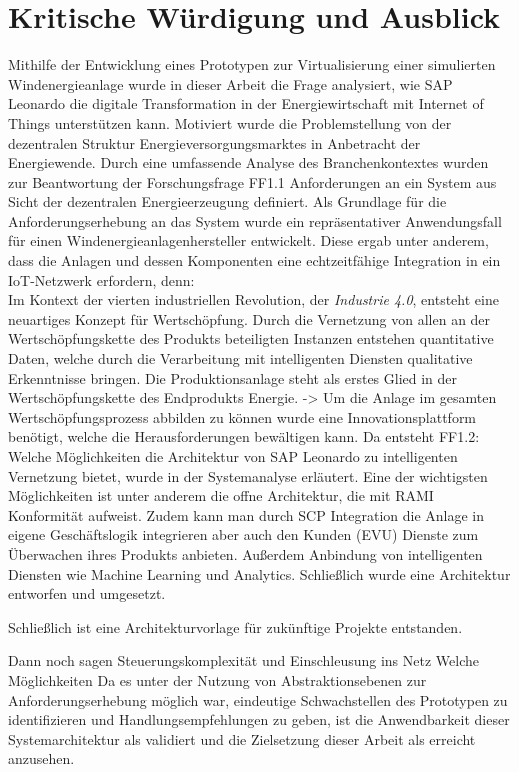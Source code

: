 \section{Kritische Würdigung und Ausblick}

Mithilfe der Entwicklung eines Prototypen zur Virtualisierung einer simulierten Windenergieanlage wurde in dieser Arbeit die Frage analysiert, wie SAP Leonardo die digitale Transformation in der Energiewirtschaft mit Internet of Things unterstützen kann. Motiviert wurde die Problemstellung von der dezentralen Struktur Energieversorgungsmarktes in Anbetracht der Energiewende. Durch eine umfassende Analyse des Branchenkontextes wurden zur Beantwortung der Forschungsfrage FF1.1 Anforderungen an ein System aus Sicht der dezentralen Energieerzeugung definiert. Als Grundlage für die Anforderungserhebung an das System wurde ein repräsentativer Anwendungsfall für einen Windenergieanlagenhersteller entwickelt. Diese ergab unter anderem, dass die Anlagen und dessen Komponenten eine echtzeitfähige Integration in ein IoT-Netzwerk erfordern, denn:
\\Im Kontext der vierten industriellen Revolution, der \textit{Industrie 4.0}, entsteht eine neuartiges Konzept für Wertschöpfung. Durch die Vernetzung von allen an der Wertschöpfungskette des Produkts beteiligten Instanzen entstehen quantitative Daten, welche durch die Verarbeitung mit intelligenten Diensten qualitative Erkenntnisse bringen. Die Produktionsanlage steht als erstes Glied in der Wertschöpfungskette des Endprodukts Energie. -> Um die Anlage im gesamten Wertschöpfungsprozess abbilden zu können wurde eine Innovationsplattform benötigt, welche die Herausforderungen bewältigen kann. Da entsteht FF1.2: Welche Möglichkeiten die Architektur von SAP Leonardo zu intelligenten Vernetzung bietet, wurde in der Systemanalyse erläutert. Eine der wichtigsten Möglichkeiten ist unter anderem die offne Architektur, die mit RAMI Konformität aufweist. Zudem kann man durch SCP Integration die Anlage in eigene Geschäftslogik integrieren aber auch den Kunden (EVU) Dienste zum Überwachen ihres Produkts anbieten. Außerdem Anbindung von intelligenten Diensten wie Machine Learning und Analytics. Schließlich wurde eine Architektur entworfen und umgesetzt. 

Schließlich ist eine Architekturvorlage für zukünftige Projekte entstanden. 

Dann noch sagen Steuerungskomplexität und Einschleusung ins Netz
Welche Möglichkeiten
Da es unter der Nutzung von Abstraktionsebenen zur Anforderungserhebung möglich war, eindeutige Schwachstellen des Prototypen zu identifizieren und Handlungsempfehlungen zu geben, ist die Anwendbarkeit dieser Systemarchitektur als validiert und die Zielsetzung dieser Arbeit als erreicht anzusehen.

